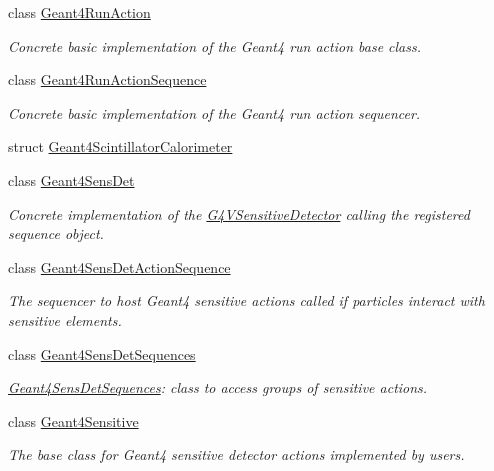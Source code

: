 \begin{DoxyCompactItemize}
class \hyperlink{class_d_d4hep_1_1_simulation_1_1_geant4_run_action}{Geant4\+Run\+Action}
\begin{DoxyCompactList}\small\item\em Concrete basic implementation of the Geant4 run action base class. \end{DoxyCompactList}\item 
class \hyperlink{class_d_d4hep_1_1_simulation_1_1_geant4_run_action_sequence}{Geant4\+Run\+Action\+Sequence}
\begin{DoxyCompactList}\small\item\em Concrete basic implementation of the Geant4 run action sequencer. \end{DoxyCompactList}\item 
struct \hyperlink{struct_d_d4hep_1_1_simulation_1_1_geant4_scintillator_calorimeter}{Geant4\+Scintillator\+Calorimeter}
\item 
class \hyperlink{class_d_d4hep_1_1_simulation_1_1_geant4_sens_det}{Geant4\+Sens\+Det}
\begin{DoxyCompactList}\small\item\em Concrete implementation of the \hyperlink{class_g4_v_sensitive_detector}{G4\+V\+Sensitive\+Detector} calling the registered sequence object. \end{DoxyCompactList}\item 
class \hyperlink{class_d_d4hep_1_1_simulation_1_1_geant4_sens_det_action_sequence}{Geant4\+Sens\+Det\+Action\+Sequence}
\begin{DoxyCompactList}\small\item\em The sequencer to host Geant4 sensitive actions called if particles interact with sensitive elements. \end{DoxyCompactList}\item 
class \hyperlink{class_d_d4hep_1_1_simulation_1_1_geant4_sens_det_sequences}{Geant4\+Sens\+Det\+Sequences}
\begin{DoxyCompactList}\small\item\em \hyperlink{class_d_d4hep_1_1_simulation_1_1_geant4_sens_det_sequences}{Geant4\+Sens\+Det\+Sequences}\+: class to access groups of sensitive actions. \end{DoxyCompactList}\item 
class \hyperlink{class_d_d4hep_1_1_simulation_1_1_geant4_sensitive}{Geant4\+Sensitive}
\begin{DoxyCompactList}\small\item\em The base class for Geant4 sensitive detector actions implemented by users. \end{DoxyCompactList}\item 

\end{DoxyCompactItemize}
